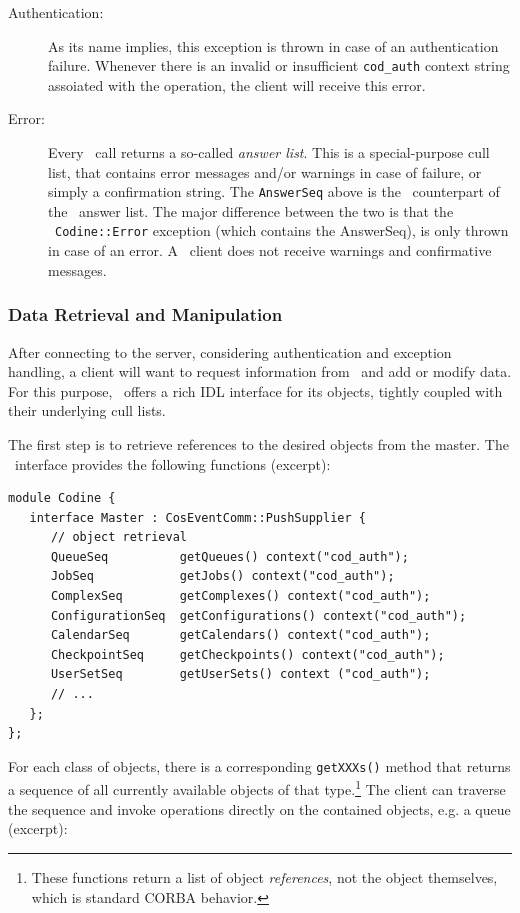 \begin{description}
\item[Authentication:] As its name implies, this exception is thrown in case
of an authentication failure. Whenever there is an invalid or insufficient
\texttt{cod\_auth} context string assoiated with the operation, the client
will receive this error.

\item[Error:] Every \codapi\ call returns a so-called \textsl{answer list}.
This is a special-purpose cull list, that contains error messages and/or
warnings in case of failure, or simply a confirmation string. The
\texttt{AnswerSeq} above is the \qidl\ counterpart of the \codapi\ answer
list. The major difference between the two is that the \qidl\
\texttt{Codine::Error} exception (which contains the AnswerSeq), is only
thrown in case of an error. A \qidl\ client does not receive warnings and
confirmative messages.
\end{description}

\subsubsection{Data Retrieval and Manipulation}
After connecting to the server, considering authentication and exception
handling, a client will want to request information from \codine\ 
and add or modify data. For this purpose, \qidl\ offers a rich IDL
interface for its objects, tightly coupled with their underlying cull lists.

The first step is to retrieve references to the desired objects from the
master. The \master\ interface provides the following functions (excerpt):

\begin{Verbatim}[fontsize=\small, frame=single]
module Codine {
   interface Master : CosEventComm::PushSupplier {
      // object retrieval
      QueueSeq          getQueues() context("cod_auth");
      JobSeq            getJobs() context("cod_auth");
      ComplexSeq        getComplexes() context("cod_auth");
      ConfigurationSeq  getConfigurations() context("cod_auth");
      CalendarSeq       getCalendars() context("cod_auth");
      CheckpointSeq     getCheckpoints() context("cod_auth");
      UserSetSeq        getUserSets() context ("cod_auth");
      // ...
   };
};
\end{Verbatim}

For each class of objects, there is a corresponding \texttt{getXXXs()} method
that returns a sequence of all currently available objects of that
type.\footnote{These functions return a list of object \emph{references}, not
the object themselves, which is standard CORBA behavior.}
The client can traverse the sequence and invoke operations directly on the
contained objects, e.g. a queue (excerpt):

